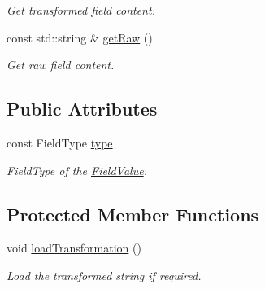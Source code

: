 \begin{DoxyCompactItemize}
\begin{DoxyCompactList}\small\item\em Get transformed field content. \end{DoxyCompactList}\item 
const std\+::string \& \hyperlink{classtudat_1_1input__output_1_1FieldValue_ab8ca94a7853ab16819629be28607fef9}{get\+Raw} ()\hypertarget{classtudat_1_1input__output_1_1FieldValue_ab8ca94a7853ab16819629be28607fef9}{}\label{classtudat_1_1input__output_1_1FieldValue_ab8ca94a7853ab16819629be28607fef9}

\begin{DoxyCompactList}\small\item\em Get raw field content. \end{DoxyCompactList}\end{DoxyCompactItemize}
\subsection*{Public Attributes}
\begin{DoxyCompactItemize}
\item 
const Field\+Type \hyperlink{classtudat_1_1input__output_1_1FieldValue_aef971559bdcdf9d08782073882e161a0}{type}\hypertarget{classtudat_1_1input__output_1_1FieldValue_aef971559bdcdf9d08782073882e161a0}{}\label{classtudat_1_1input__output_1_1FieldValue_aef971559bdcdf9d08782073882e161a0}

\begin{DoxyCompactList}\small\item\em Field\+Type of the \hyperlink{classtudat_1_1input__output_1_1FieldValue}{Field\+Value}. \end{DoxyCompactList}\end{DoxyCompactItemize}
\subsection*{Protected Member Functions}
\begin{DoxyCompactItemize}
\item 
void \hyperlink{classtudat_1_1input__output_1_1FieldValue_a8bbe59c9bab2bcfc0fb11d714345d33f}{load\+Transformation} ()\hypertarget{classtudat_1_1input__output_1_1FieldValue_a8bbe59c9bab2bcfc0fb11d714345d33f}{}\label{classtudat_1_1input__output_1_1FieldValue_a8bbe59c9bab2bcfc0fb11d714345d33f}

\begin{DoxyCompactList}\small\item\em Load the transformed string if required. \end{DoxyCompactList}\end{DoxyCompactItemize}


